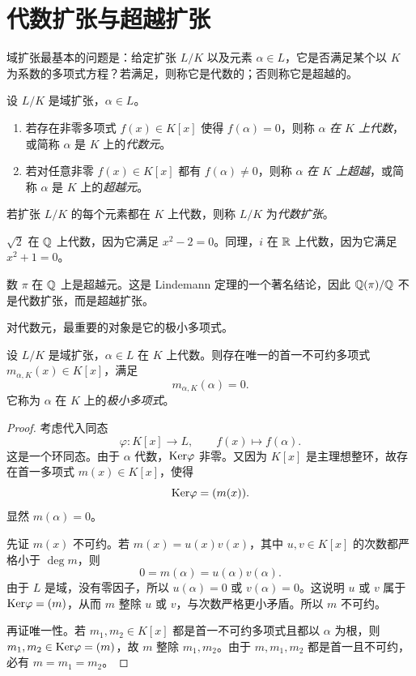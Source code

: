 \section{代数扩张与超越扩张}

域扩张最基本的问题是：给定扩张 $L/K$ 以及元素 $\alpha\in L$，它是否满足某个以 $K$ 为系数的多项式方程？若满足，则称它是代数的；否则称它是超越的。

\begin{definition}
设 $L/K$ 是域扩张，$\alpha\in L$。
\begin{enumerate}[label=(\arabic*)]
  \item 若存在非零多项式 $f(x)\in K[x]$ 使得 $f(\alpha)=0$，则称 $\alpha$ \emph{在 $K$ 上代数}，或简称 $\alpha$ 是 $K$ 上的\emph{代数元}。
  \item 若对任意非零 $f(x)\in K[x]$ 都有 $f(\alpha)\ne 0$，则称 $\alpha$ \emph{在 $K$ 上超越}，或简称 $\alpha$ 是 $K$ 上的\emph{超越元}。
\end{enumerate}
若扩张 $L/K$ 的每个元素都在 $K$ 上代数，则称 $L/K$ 为\emph{代数扩张}。
\end{definition}

\begin{example}
$\sqrt2$ 在 $\mathbb{Q}$ 上代数，因为它满足 $x^2-2=0$。同理，$i$ 在 $\mathbb{R}$ 上代数，因为它满足 $x^2+1=0$。
\end{example}

\begin{example}
数 $\pi$ 在 $\mathbb{Q}$ 上是超越元。这是 Lindemann 定理的一个著名结论，因此 $\mathbb{Q}(\pi)/\mathbb{Q}$ 不是代数扩张，而是超越扩张。
\end{example}

对代数元，最重要的对象是它的极小多项式。

\begin{theorem}[极小多项式]
设 $L/K$ 是域扩张，$\alpha\in L$ 在 $K$ 上代数。则存在唯一的首一不可约多项式 $m_{\alpha,K}(x)\in K[x]$，满足
\[
m_{\alpha,K}(\alpha)=0.
\]
它称为 $\alpha$ 在 $K$ 上的\emph{极小多项式}。
\end{theorem}

\begin{proof}
考虑代入同态
\[
\varphi:K[x]\longrightarrow L,\qquad f(x)\longmapsto f(\alpha).
\]
这是一个环同态。由于 $\alpha$ 代数，$\mathrm{Ker}\varphi$ 非零。又因为 $K[x]$ 是主理想整环，故存在首一多项式 $m(x)\in K[x]$，使得
\[
\mathrm{Ker}\varphi=(m(x)).
\]
显然 $m(\alpha)=0$。

先证 $m(x)$ 不可约。若 $m(x)=u(x)v(x)$，其中 $u,v\in K[x]$ 的次数都严格小于 $\deg m$，则
\[
0=m(\alpha)=u(\alpha)v(\alpha).
\]
由于 $L$ 是域，没有零因子，所以 $u(\alpha)=0$ 或 $v(\alpha)=0$。这说明 $u$ 或 $v$ 属于 $\mathrm{Ker}\varphi=(m)$，从而 $m$ 整除 $u$ 或 $v$，与次数严格更小矛盾。所以 $m$ 不可约。

再证唯一性。若 $m_1,m_2\in K[x]$ 都是首一不可约多项式且都以 $\alpha$ 为根，则 $m_1,m_2\in\mathrm{Ker}\varphi=(m)$，故 $m$ 整除 $m_1,m_2$。由于 $m,m_1,m_2$ 都是首一且不可约，必有 $m=m_1=m_2$。
\end{proof}

